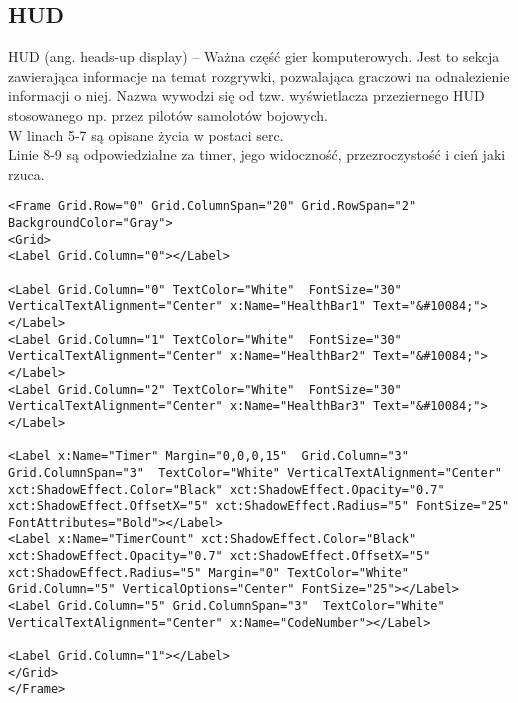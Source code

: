 \subsection{HUD}
\hspace{0.60cm}HUD (ang. heads-up display) – Ważna część gier komputerowych. Jest to sekcja zawierająca informacje na temat rozgrywki, pozwalająca graczowi na odnalezienie informacji o niej. Nazwa wywodzi się od tzw. wyświetlacza przeziernego HUD stosowanego np. przez pilotów samolotów bojowych.
\\
W linach 5-7 są opisane życia w postaci serc.
\\
Linie 8-9 są odpowiedzialne za timer, jego widoczność, przezroczystość i cień jaki rzuca.
\begin{lstlisting}[caption=HUD]
            <Frame Grid.Row="0" Grid.ColumnSpan="20" Grid.RowSpan="2" BackgroundColor="Gray">
<Grid>
<Label Grid.Column="0"></Label>

<Label Grid.Column="0" TextColor="White"  FontSize="30" VerticalTextAlignment="Center" x:Name="HealthBar1" Text="&#10084;"></Label>
<Label Grid.Column="1" TextColor="White"  FontSize="30" VerticalTextAlignment="Center" x:Name="HealthBar2" Text="&#10084;"></Label>
<Label Grid.Column="2" TextColor="White"  FontSize="30" VerticalTextAlignment="Center" x:Name="HealthBar3" Text="&#10084;"></Label>

<Label x:Name="Timer" Margin="0,0,0,15"  Grid.Column="3" Grid.ColumnSpan="3"  TextColor="White" VerticalTextAlignment="Center" xct:ShadowEffect.Color="Black" xct:ShadowEffect.Opacity="0.7" xct:ShadowEffect.OffsetX="5" xct:ShadowEffect.Radius="5" FontSize="25" FontAttributes="Bold"></Label>
<Label x:Name="TimerCount" xct:ShadowEffect.Color="Black" xct:ShadowEffect.Opacity="0.7" xct:ShadowEffect.OffsetX="5" xct:ShadowEffect.Radius="5" Margin="0" TextColor="White" Grid.Column="5" VerticalOptions="Center" FontSize="25"></Label>
<Label Grid.Column="5" Grid.ColumnSpan="3"  TextColor="White" VerticalTextAlignment="Center" x:Name="CodeNumber"></Label>

<Label Grid.Column="1"></Label>
</Grid>
</Frame>
\end{lstlisting}

